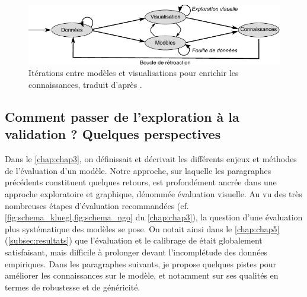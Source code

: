 \begin{figure}[H]
	\centering
	\includegraphics[width=\linewidth]{img/schema_keim.pdf}
	\caption[Itérations entre modèles et visualisations pour enrichir les connaissances.]{Itérations entre modèles et visualisations pour enrichir les connaissances, traduit d'après \textcite[fig.~1, p.~156]{keim_visual_2008}.}
	\label{fig:schema-va}
\end{figure}


\subsection{Comment passer de l'exploration à la validation ? Quelques perspectives \label{subsec:perspectives-validation}}

Dans le \cref{chap:chap3}, on définissait et décrivait les différents enjeux et méthodes de l'évaluation d'un modèle.
Notre approche, sur laquelle les paragraphes précédents constituent quelques retours, est profondément ancrée dans une approche exploratoire et graphique, dénommée \og évaluation visuelle\fg{}.
Au vu des très nombreuses étapes d'évaluation recommandées (cf. \cref{fig:schema_kluegl,fig:schema_ngo} du \cref{chap:chap3}), la question d'une évaluation plus systématique des modèles se pose.
On notait ainsi dans le \cref{chap:chap5} (\cref{subsec:resultats}) que l'évaluation et le calibrage de \simfeodal{} était globalement satisfaisant, mais difficile à prolonger devant l'incomplétude des données empiriques.
Dans les paragraphes suivants, je propose quelques pistes pour améliorer les connaissances sur le modèle, et notamment sur ses qualités en termes de robustesse et de généricité.

